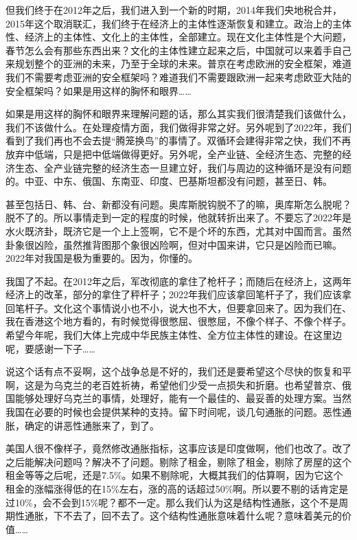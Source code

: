 \documentclass[UTF8, 12pt, a4paper]{ctexrep}
\begin{document}
但我们终于在2012年之后，我们进入到一个新的时期，2014年我们央地税合并，2015年这个取消联汇，我们终于在经济上的主体性逐渐恢复和建立。政治上的主体性、经济上的主体性、文化上的主体性，全部建立。现在文化主体性是个大问题，春节怎么会有那些东西出来？文化的主体性建立起来之后，中国就可以来着手自己来规划整个的亚洲的未来，乃至于全球的未来。普京在考虑欧洲的安全框架，难道我们不需要考虑亚洲的安全框架吗？难道我们不需要跟欧洲一起来考虑欧亚大陆的安全框架吗？如果是用这样的胸怀和眼界……

如果是用这样的胸怀和眼界来理解问题的话，那么其实我们很清楚我们该做什么，我们不该做什么。在处理疫情方面，我们做得非常之好。另外呢到了2022年，我们看到了我们再也不会去提“腾笼换鸟”的事情了。双循环会建得非常之快，我们不再放弃中低端，只是把中低端做得更好。另外呢，全产业链、全经济生态、完整的经济生态、全产业链完整的经济生态一旦建立好，我们与周边的这种循环是没有问题的。中亚、中东、俄国、东南亚、印度、巴基斯坦都没有问题，甚至日、韩。

甚至包括日、韩、台、新都没有问题。奥库斯脱钩脱不了的嘛，奥库斯怎么脱呢？脱不了的。所以事情走到一定的程度的时候，他就转折出来了。不要忘了2022年是水火既济卦，既济它是一个上上签啊，它不是个坏的东西，尤其对中国而言。虽然卦象很凶险，虽然推背图那个象很凶险啊，但对中国来讲，它只是凶险而已嘛。2022年对我国是极为重要的。因为，你懂的。

我国了不起。在2012年之后，军改彻底的拿住了枪杆子；而随后在经济上，这两年经济上的改革，部分的拿住了秤杆子；2022年我们应该拿回笔杆子了，我们应该拿回笔杆子。文化这个事情说小也不小，说大也不大，但要拿回来了。因为我们在、我在香港这个地方看的，有时候觉得很憋屈、很憋屈，不像个样子、不像个样子。希望今年呢，我们大体上完成中华民族主体性、全方位主体性的建设。在这里边呢，要感谢一下子……

说这个话有点不妥啊，这个战争总是不好的，我们还是要希望这个尽快的恢复和平啊，这是为乌克兰的老百姓祈祷，希望他们少受一点损失和折磨。也希望普京、俄国能够处理好乌克兰的事情，处理好，能有一个最佳的、最妥善的处理方案。当然我国在必要的时候也会提供某种的支持。留下时间呢，谈几句通胀的问题。恶性通胀，确定的讲恶性通胀来了，到了。

美国人很不像样子，竟然修改通胀指标，这事应该是印度做啊，他们也改了。改了之后能解决问题吗？解决不了问题。剔除了租金，剔除了租金，剔除了房屋的这个租金等等之后呢，还是7.5\%。如果不剔除呢，大概其我们的估算啊，因为它这个租金的涨幅涨得低的在15\%左右，涨的高的话超过50\%啊。所以要不剔的话肯定是过10\%，会不会到15\%呢？都不一定。那么我们认为这是结构性通胀，这个不是周期性通胀，下不去了，回不去了。这个结构性通胀意味着什么呢？意味着美元的价值……
\end{document}
